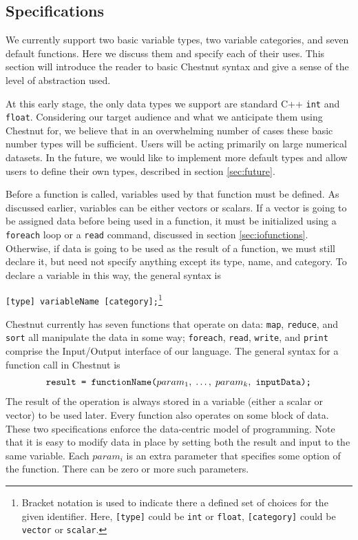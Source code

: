 \documentclass[twocolumn]{article}
\renewcommand{\|}{\origbar} %
\newcommand{\code}[1]{\texttt{#1}}
\begin{document}
\subsection{Specifications}
\label{sec:specifications}

We currently support two basic variable types, two variable categories, and seven default functions. Here we discuss them and specify each of their uses. This section will introduce the reader to basic Chestnut syntax and give a sense of the level of abstraction used.

At this early stage, the only data types we support are standard C++ \code{int} and \code{float}. Considering our target audience and what we anticipate them using Chestnut for, we believe that in an overwhelming number of cases these basic number types will be sufficient. Users will be acting primarily on large numerical datasets. In the future, we would like to implement more default types and allow users to define their own types, described in section \ref{sec:future}. 

Before a function is called, variables used by that function must be defined. As discussed earlier, variables can be either vectors or scalars. If a vector is going to be assigned data before being used in a function, it must be initialized using a \code{foreach} loop or a \code{read} command, discussed in section \ref{sec:iofunctions}. Otherwise, if data is going to be used as the result of a function, we must still declare it, but need not specify anything except its type, name, and category. To declare a variable in this way, the general syntax is
\begin{center}
  \code{[type] variableName [category];}\footnote{Bracket notation is used to indicate there a defined set of choices for the given identifier. Here, \code{[type]} could be \code{int} or \code{float}, \code{[category]} could be \code{vector} or \code{scalar}.}
\end{center}

Chestnut currently has seven functions that operate on data: \code{map}, \code{reduce}, and \code{sort} all manipulate the data in some way; \code{foreach}, \code{read}, \code{write}, and \code{print} comprise the Input/Output interface of our language. The general syntax for a function call in Chestnut is
\begin{align*}
  \if@twocolumn
    \code{result } &\code{= functionName(} \\ &\code{$param_1,\;\ldots, \;param_k,$ } \\ &\code{inputData);}
  \else
    \code{result = functionName($param_1,\;\ldots, \;param_k,$ inputData);}
  \fi
\end{align*}
The result of the operation is always stored in a variable (either a scalar or vector) to be used later. Every function also operates on some block of data. These two specifications enforce the data-centric model of programming. Note that it is easy to modify data in place by setting both the result and input to the same variable. Each $param_i$ is an extra parameter that specifies some option of the function. There can be zero or more such parameters. 
\end{document}
